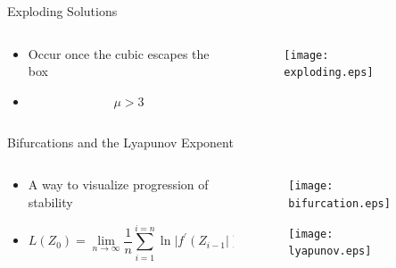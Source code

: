 \documentclass{beamer}
\begin{document}
\begin{frame}{Exploding Solutions}
	\begin{columns}
		\begin{column}{0.5\textwidth}
			\begin{itemize}
				\item
					Occur once the cubic escapes the box
				\item
					\begin{equation*}
						\mu>3
					\end{equation*}
			\end{itemize}
		\end{column}
		\begin{column}{0.5\textwidth}
			\begin{figure}
				\centering
				\texttt{[image: exploding.eps]}
			\end{figure}
		\end{column}
	\end{columns}
\end{frame}

\begin{frame}{Bifurcations and the Lyapunov Exponent}
	\begin{columns}
		\begin{column}{0.5\textwidth}
			\begin{itemize}
				\item
					A way to visualize progression of stability
				\item
					\begin{equation*}
						L(Z_0)=\lim\limits_{n\to\infty}\frac{1}{n}\sum\limits_{i=1}^{i=n}\ln\lvert f^\prime(Z_{i-1}\rvert)
					\end{equation*}
			\end{itemize}
		\end{column}
		\begin{column}{0.5\textwidth}
			\begin{figure}
				\centering
				\texttt{[image: bifurcation.eps]}
			\end{figure}
			\begin{figure}
				\centering
				\texttt{[image: lyapunov.eps]}
			\end{figure}
		\end{column}
	\end{columns}
\end{frame}
\end{document}
